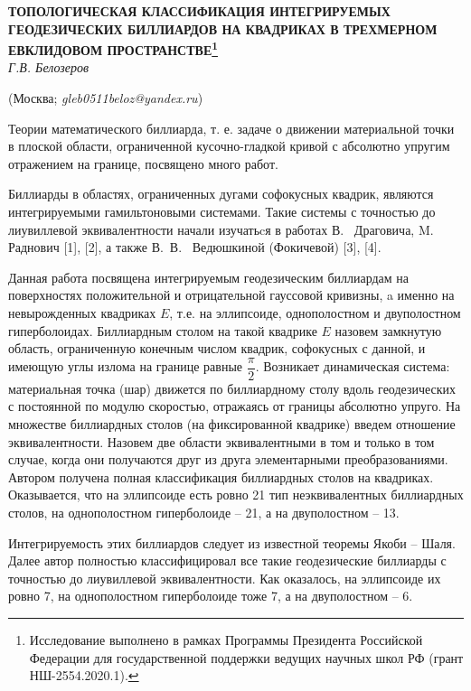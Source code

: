 \begin{center}
    {\bf ТОПОЛОГИЧЕСКАЯ КЛАССИФИКАЦИЯ ИНТЕГРИРУЕМЫХ ГЕОДЕЗИЧЕСКИХ БИЛЛИАРДОВ НА КВАДРИКАХ В ТРЕХМЕРНОМ ЕВКЛИДОВОМ ПРОСТРАНСТВЕ\footnote{Исследование выполнено в рамках Программы Президента Российской Федерации для государственной поддержки ведущих научных школ РФ (грант НШ-2554.2020.1).}}\\

    {\it Г.В. Белозеров}

    (Москва; {\it gleb0511beloz@yandex.ru})
\end{center}


Теории математического биллиарда, т. е. задаче о движении материальной
точки в плоской области, ограниченной кусочно-гладкой кривой с абсолютно
упругим отражением на границе, посвящено много работ.

Биллиарды в областях, ограниченных дугами софокусных квадрик, являются интегрируемыми гамильтоновыми системами.
Такие системы с точностью до лиувиллевой эквивалентности начали изучатьcя
в работах В.~ Драговича, M.~ Раднович [1], [2], а также В.\, В.~ Ведюшкиной (Фокичевой)  [3], [4].

Данная работа посвящена интегрируемым  геодезическим биллиардам на поверхностях положительной и отрицательной гауссовой
кривизны,  a именно на невырожденных квадриках $E$, т.е. на эллипсоиде, однополостном и двуполостном гиперболоидах.
Биллиардным столом на такой квадрике $E$ назовем замкнутую область,
ограниченную конечным числом квадрик, софокусных с данной, и имеющую углы излома на границе равные
$\dfrac{\pi}{2}$. Возникает динамическая система:
материальная точка (шар) движется по биллиардному столу
вдоль геодезических с постоянной по модулю скоростью, отражаясь от границы абсолютно упруго. На
множестве биллиардных столов (на фиксированной квадрике) введем отношение эквивалентности.
Назовем две области эквивалентными
в том и только в том случае, когда они получаются друг из друга  элементарными преобразованиями.
Автором получена полная классификация  биллиардных столов на квадриках. Оказывается, что
на эллипсоиде есть ровно 21 тип неэквивалентных биллиардных столов, на однополостном гиперболоиде -- 21, а на двуполостном -- 13.


Интегрируемость этих биллиардов  следует из известной теоремы Якоби -- Шаля.
Далее автор полностью классифицировал  все такие геодезические биллиарды с
точностью до лиувиллевой эквивалентности. Как оказалось, на эллипсоиде их ровно 7, на однополостном гиперболоиде  тоже 7, а на двуполостном -- 6.

